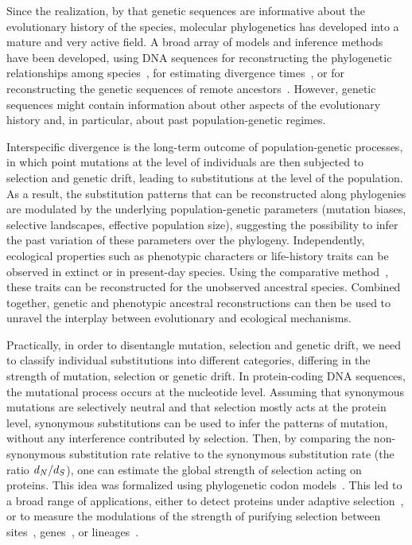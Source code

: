 \documentclass{article}
\begin{document}
Since the realization, by \citet{Zuckerkandl1965} that genetic sequences are informative about the evolutionary history of the species, molecular phylogenetics has developed into a mature and very active field.
A broad array of models and inference methods have been developed, using {DNA} sequences for reconstructing the phylogenetic relationships among species~\citep{Felsenstein1981}, for estimating divergence times~\citep{Thorne2002}, or for reconstructing the genetic sequences of remote ancestors~\citep{Liberles2007}.
However, genetic sequences might contain information about other aspects of the evolutionary history and, in particular, about past population-genetic regimes.

Interspecific divergence is the long-term outcome of population-genetic processes, in which point mutations at the level of individuals are then subjected to selection and {genetic drift}, leading to substitutions at the level of the population.
As a result, the {substitution} patterns that can be reconstructed along phylogenies are modulated by the underlying population-genetic parameters (mutation biases, selective landscapes, effective population size), suggesting the possibility to infer the past variation of these parameters over the phylogeny.
Independently, ecological properties such as phenotypic characters or life-history traits can be observed in extinct or in present-day species.
Using the comparative method~\citep{Felsenstein1985}, these traits can be reconstructed for the unobserved ancestral species.
Combined together, genetic and phenotypic ancestral reconstructions can then be used to unravel the interplay between evolutionary and ecological mechanisms.

Practically, in order to disentangle mutation, selection and {genetic drift}, we need to classify individual substitutions into different categories, differing in the strength of mutation, selection or {genetic drift}.
In protein-coding {DNA} sequences, the mutational process occurs at the nucleotide level.
Assuming that {synonymous} mutations are selectively {neutral} and that selection mostly acts at the protein level, {synonymous} substitutions can be used to infer the patterns of mutation, without any interference contributed by selection.
Then, by comparing the {non-synonymous} {substitution} rate relative to the {synonymous} {substitution} rate (the ratio $d_N / d_S$), one can estimate the global strength of selection acting on proteins.
This idea was formalized using phylogenetic {codon} models~\citep{Muse1994,Goldman1994}.
This led to a broad range of applications, either to detect proteins under adaptive selection~\citep{Kosiol2008}, or to measure the modulations of the strength of purifying selection between sites~\citep{Echave2016}, genes~\citep{Zhang2015}, or lineages~\citep{Lartillot2011}.
\end{document}

